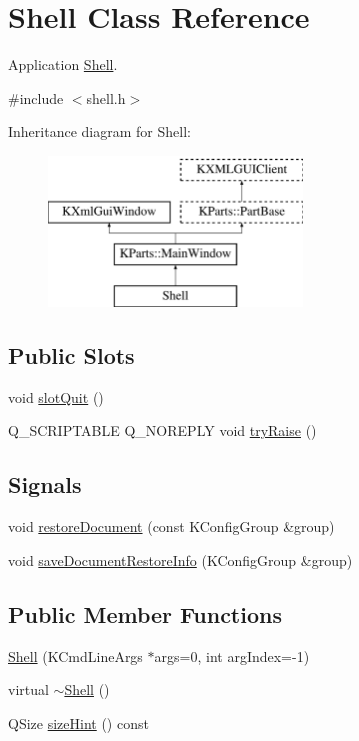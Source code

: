 \hypertarget{classShell}{\section{Shell Class Reference}
\label{classShell}
}


Application \hyperlink{classShell}{Shell}.  




{\ttfamily \#include $<$shell.\+h$>$}

Inheritance diagram for Shell\+:\begin{figure}[H]
\begin{center}
\leavevmode
\includegraphics[height=4.000000cm]{classShell}
\end{center}
\end{figure}
\subsection*{Public Slots}
\begin{DoxyCompactItemize}
\item 
void \hyperlink{classShell_a119b423d292c96ce85c7bb76f17763de}{slot\+Quit} ()
\item 
Q\+\_\+\+S\+C\+R\+I\+P\+T\+A\+B\+L\+E Q\+\_\+\+N\+O\+R\+E\+P\+L\+Y void \hyperlink{classShell_a852473cac38370ff621a443bd01b160d}{try\+Raise} ()
\end{DoxyCompactItemize}
\subsection*{Signals}
\begin{DoxyCompactItemize}
\item 
void \hyperlink{classShell_a1cce8d294c75c214e6c49adf7f8092bb}{restore\+Document} (const K\+Config\+Group \&group)
\item 
void \hyperlink{classShell_a17730ee41db08e7aed9bda4699c0e333}{save\+Document\+Restore\+Info} (K\+Config\+Group \&group)
\end{DoxyCompactItemize}
\subsection*{Public Member Functions}
\begin{DoxyCompactItemize}
\item 
\hyperlink{classShell_a6a764e14c2d3dba247ad7dcf57cdb966}{Shell} (K\+Cmd\+Line\+Args $\ast$args=0, int arg\+Index=-\/1)
\item 
virtual \hyperlink{classShell_a95f78f499b3dfd9c83f4099cf90ef3df}{$\sim$\+Shell} ()
\item 
Q\+Size \hyperlink{classShell_a7d578e81ff2d7dcc08e91d1f7e342010}{size\+Hint} () const 
\end{DoxyCompactItemize}
